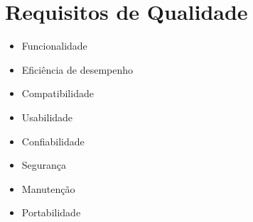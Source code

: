 \section[Requisitos de Qualidade]{Requisitos de Qualidade}
 \begin{itemize}
        \item Funcionalidade
		\item Eficiência de desempenho
		\item Compatibilidade
		\item Usabilidade
		\item Confiabilidade
		\item Segurança
		\item Manutenção
		\item Portabilidade
    \end{itemize}
